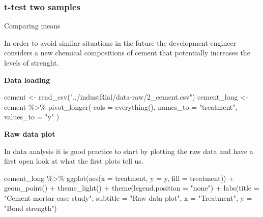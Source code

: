 \documentclass[
]{book}
\newenvironment{Shaded}{\begin{snugshade}}{\end{snugshade}}
\newcommand{\AttributeTok}[1]{\textcolor[rgb]{0.77,0.63,0.00}{#1}}
\newcommand{\FunctionTok}[1]{\textcolor[rgb]{0.00,0.00,0.00}{#1}}
\newcommand{\NormalTok}[1]{#1}
\newcommand{\OtherTok}[1]{\textcolor[rgb]{0.56,0.35,0.01}{#1}}
\newcommand{\SpecialCharTok}[1]{\textcolor[rgb]{0.00,0.00,0.00}{#1}}
\newcommand{\StringTok}[1]{\textcolor[rgb]{0.31,0.60,0.02}{#1}}
\begin{document}
\hypertarget{t-test-two-samples}{%
\subsubsection{t-test two samples}\label{t-test-two-samples}}

Comparing means

In order to avoid similar situations in the future the development engineer considers a new chemical compositions of cement that potentially increases the levels of strenght.

\textbf{Data loading}

\begin{Shaded}
\begin{Highlighting}[]
\NormalTok{cement }\OtherTok{\textless{}{-}} \FunctionTok{read\_csv}\NormalTok{(}\StringTok{"../industRial/data{-}raw/2\_cement.csv"}\NormalTok{)}
\NormalTok{cement\_long }\OtherTok{\textless{}{-}}\NormalTok{ cement }\SpecialCharTok{\%\textgreater{}\%}
  \FunctionTok{pivot\_longer}\NormalTok{(}
    \AttributeTok{cols =} \FunctionTok{everything}\NormalTok{(), }\AttributeTok{names\_to =} \StringTok{"treatment"}\NormalTok{, }\AttributeTok{values\_to =} \StringTok{"y"}
\NormalTok{  )}
\end{Highlighting}
\end{Shaded}

\textbf{Raw data plot}

In data analysis it is good practice to start by plotting the raw data and have a first open look at what the first plots tell us.

\begin{Shaded}
\begin{Highlighting}[]
\NormalTok{cement\_long }\SpecialCharTok{\%\textgreater{}\%} 
  \FunctionTok{ggplot}\NormalTok{(}\FunctionTok{aes}\NormalTok{(}\AttributeTok{x =}\NormalTok{ treatment, }\AttributeTok{y =}\NormalTok{ y, }\AttributeTok{fill =}\NormalTok{ treatment)) }\SpecialCharTok{+}
  \FunctionTok{geom\_point}\NormalTok{() }\SpecialCharTok{+}
  \FunctionTok{theme\_light}\NormalTok{() }\SpecialCharTok{+}
  \FunctionTok{theme}\NormalTok{(}\AttributeTok{legend.position =} \StringTok{"none"}\NormalTok{) }\SpecialCharTok{+}
  \FunctionTok{labs}\NormalTok{(}\AttributeTok{title =} \StringTok{"Cement mortar case study"}\NormalTok{,}
       \AttributeTok{subtitle =} \StringTok{"Raw data plot"}\NormalTok{,}
       \AttributeTok{x =} \StringTok{"Treatment"}\NormalTok{,}
       \AttributeTok{y =} \StringTok{"Bond strength"}\NormalTok{)}
\end{Highlighting}
\end{Shaded}
\end{document}
